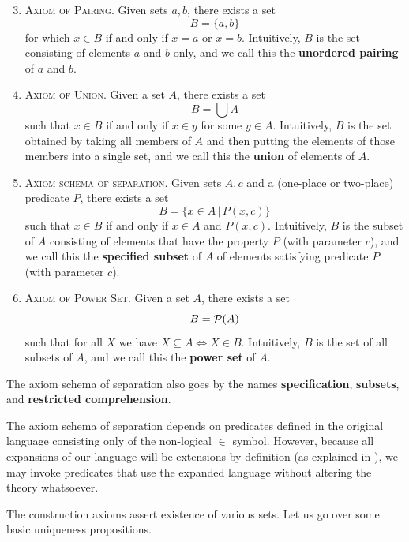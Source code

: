 \begin{enumerate}[itemsep=-0.4ex, label=\textup{(ZFC${\arabic*}$)}]\setcounter{enumi}{2}
	\item\textsc{Axiom of Pairing.}
	Given sets $a, b$, there exists a set 
	\[ B = \{a, b\} \]
	for which $x\in B$ if and only if $x = a$ or $x = b$.
	Intuitively, $B$ is the set consisting of elements $a$ and $b$ only, and we call this the \textbf{unordered pairing} of $a$ and $b$.
	\item\textsc{Axiom of Union.}
	Given a set $A$, there exists a set 
	\[ B = \bigcup A \] 
	such that $x\in B$ if and only if $x\in y$ for some $y\in A$.
	Intuitively, $B$ is the set obtained by taking all members of $A$ and then putting the elements of those members into a single set, and we call this the \textbf{union} of elements of $A$.
	\item\textsc{Axiom schema of separation.}
	Given sets $A, c$ and a (one-place or two-place) predicate $P$, there exists a set 
	\[ B = \{ x\in A \,|\, P(x, c) \} \] 
	such that $x\in B$ if and only if $x\in A$ and $P(x, c)$. 
	Intuitively, $B$ is the subset of $A$ consisting of elements that have the property $P$ (with parameter $c$), and we call this the \textbf{specified subset} of $A$ of elements satisfying predicate $P$ (with parameter $c$).
	\item\textsc{Axiom of Power Set.}
	Given a set $A$, there exists a set 
	\[ B = \mathcal{P}(A) \] 
	such that for all $X$ we have $X\subseteq A\iff X\in B$. 
	Intuitively, $B$ is the set of all subsets of $A$, and we call this the \textbf{power set} of $A$.
\end{enumerate}

The axiom schema of separation also goes by the names \textbf{specification}, \textbf{subsets}, and \textbf{restricted comprehension}. 

The axiom schema of separation depends on predicates defined in the original language consisting only of the non-logical $\in$ symbol.
However, because all expansions of our language will be extensions by definition (as explained in ), we may invoke predicates that use the expanded language without altering the theory whatsoever. 

The construction axioms assert existence of various sets. 
Let us go over some basic uniqueness propositions. 

